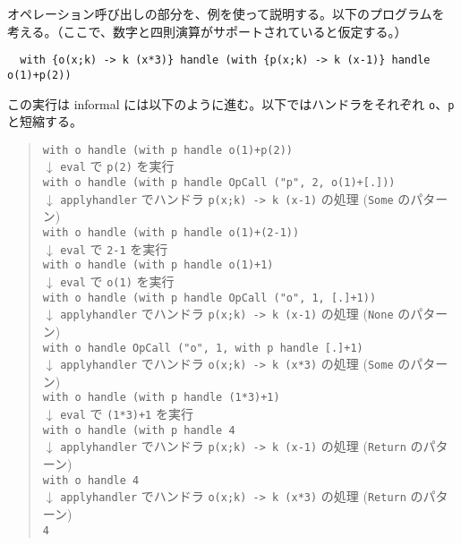オペレーション呼び出しの部分を、例を使って説明する。以下のプログラムを
考える。（ここで、数字と四則演算がサポートされていると仮定する。）
\begin{verbatim}
  with {o(x;k) -> k (x*3)} handle (with {p(x;k) -> k (x-1)} handle o(1)+p(2))
\end{verbatim}
この実行は informal には以下のように進む。以下ではハンドラをそれぞれ \texttt{\LBR{}o\RBR}、\texttt{\LBR{}p\RBR} と短縮する。
\begin{quote}
\texttt{with \LBR{}o\RBR{} handle (with \LBR{}p\RBR{} handle o(1)+p(2))}\\
$\downarrow$ \texttt{eval} で \texttt{p(2)} を実行\\
\texttt{with \LBR{}o\RBR{} handle (with \LBR{}p\RBR{} handle OpCall ("p", 2, o(1)+[.]))}\\
$\downarrow$ \texttt{apply\US{}handler} でハンドラ \texttt{\LBR{}p(x;k) -> k (x-1)\RBR} の処理 (\texttt{Some} のパターン)\\
\texttt{with \LBR{}o\RBR{} handle (with \LBR{}p\RBR{} handle o(1)+(2-1))}\\
$\downarrow$ \texttt{eval} で \texttt{2-1} を実行\\
\texttt{with \LBR{}o\RBR{} handle (with \LBR{}p\RBR{} handle o(1)+1)}\\
$\downarrow$ \texttt{eval} で \texttt{o(1)} を実行\\
\texttt{with \LBR{}o\RBR{} handle (with \LBR{}p\RBR{} handle OpCall ("o", 1, [.]+1))}\\
$\downarrow$ \texttt{apply\US{}handler} でハンドラ \texttt{\LBR{}p(x;k) -> k (x-1)\RBR} の処理 (\texttt{None} のパターン)\\
\texttt{with \LBR{}o\RBR{} handle OpCall ("o", 1, with \LBR{}p\RBR{} handle [.]+1)}\\
$\downarrow$ \texttt{apply\US{}handler} でハンドラ \texttt{\LBR{}o(x;k) -> k (x*3)\RBR} の処理 (\texttt{Some} のパターン)\\
\texttt{with \LBR{}o\RBR{} handle (with \LBR{}p\RBR{} handle (1*3)+1)}\\
$\downarrow$ \texttt{eval} で \texttt{(1*3)+1} を実行\\
\texttt{with \LBR{}o\RBR{} handle (with \LBR{}p\RBR{} handle 4}\\
$\downarrow$ \texttt{apply\US{}handler} でハンドラ \texttt{\LBR{}p(x;k) -> k (x-1)\RBR} の処理 (\texttt{Return} のパターン)\\
\texttt{with \LBR{}o\RBR{} handle 4}\\
$\downarrow$ \texttt{apply\US{}handler} でハンドラ \texttt{\LBR{}o(x;k) -> k (x*3)\RBR} の処理 (\texttt{Return} のパターン)\\
\texttt{4}
\end{quote}


